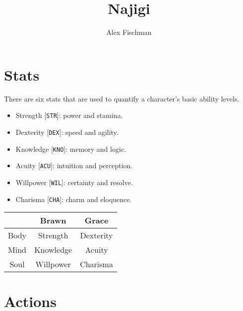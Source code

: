 \documentclass[12pt]{article}
\title{Najigi}
\author{Alex Fischman}
\newcommand{\STR}{\texttt{STR}}
\newcommand{\DEX}{\texttt{DEX}}
\newcommand{\KNO}{\texttt{KNO}}
\newcommand{\ACU}{\texttt{ACU}}
\newcommand{\WIL}{\texttt{WIL}}
\newcommand{\CHA}{\texttt{CHA}}
\begin{document}
\maketitle
\tableofcontents
\clearpage

\pagebreak
\section{Stats}

There are six stats that are used to quantify a character's basic ability levels.

\begin{multicols}{2}

\begin{itemize}
\item Strength [\STR]: power and stamina.
\item Dexterity [\DEX]: speed and agility.
\item Knowledge [\KNO]: memory and logic.
\item Acuity [\ACU]: intuition and perception.
\item Willpower [\WIL]: certainty and resolve.
\item Charisma [\CHA]: charm and eloquence.
\end{itemize}

\columnbreak

\begin{tabularx}{\linewidth}{C|C C}
& Brawn & Grace \\\hline
Body & Strength & Dexterity \\
Mind & Knowledge & Acuity \\
Soul & Willpower & Charisma
\end{tabularx}

\end{multicols}

\pagebreak
\section{Actions}
\end{document}
